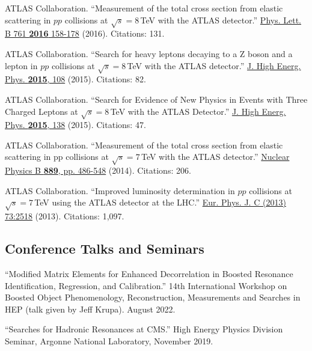 \documentclass[12pt]{article} %
\begin{document}
\smallskip

ATLAS Collaboration. ``Measurement of the total cross section from elastic scattering in $pp$ collisions at  $\sqrt{s}=8$\,TeV with the ATLAS detector.'' \href{https://doi.org/10.1016/j.physletb.2016.08.020}{Phys. Lett. B 761 \textbf{2016} 158-178} (2016). Citations: 131.

\smallskip

ATLAS Collaboration. ``Search for heavy leptons decaying to a Z boson and a lepton in $pp$ collisions at $\sqrt{s}=8$\,TeV with the ATLAS detector.'' \href{https://doi.org/10.1007/JHEP09(2015)108}{J. High Energ. Phys. \textbf{2015}, 108} (2015). Citations: 82.

\smallskip

ATLAS Collaboration. ``Search for Evidence of New Physics in Events with Three Charged Leptons at $\sqrt{s}=8$\,TeV with the ATLAS Detector.'' \href{https://doi.org/10.1007/JHEP08(2015)138}{J. High Energ. Phys. \textbf{2015}, 138} (2015). Citations: 47.

\smallskip

ATLAS Collaboration. ``Measurement of the total cross section from elastic scattering in pp collisions at $\sqrt{s}=7$\,TeV with the ATLAS detector.'' \href{https://doi.org/10.1016/j.nuclphysb.2014.10.019}{Nuclear Physics B \textbf{889}, pp. 486-548} (2014). Citations: 206.

\smallskip

ATLAS Collaboration. ``Improved luminosity determination in $pp$ collisions at $\sqrt{s}=7$\,TeV using the ATLAS detector at the LHC.'' \href{https://doi.org/10.1140/epjc/s10052-013-2518-3}{Eur. Phys. J. C (2013) 73:2518} (2013). Citations: 1,097.


\subsection*{Conference Talks and Seminars}

``Modified Matrix Elements for Enhanced Decorrelation in Boosted Resonance Identification, Regression, and Calibration.'' 14th International Workshop on Boosted Object Phenomenology, Reconstruction, Measurements and Searches in HEP (talk given by Jeff Krupa). August 2022. 

``Searches for Hadronic Resonances at CMS.'' High Energy Physics Division Seminar, Argonne National Laboratory, November 2019.

\smallskip
\end{document}
